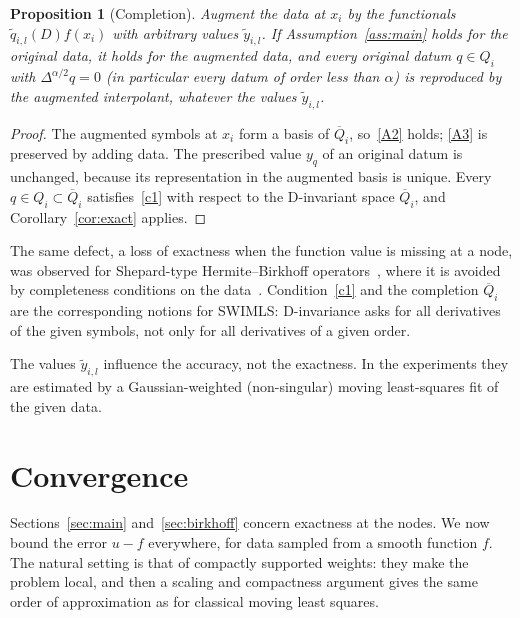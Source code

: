 \documentclass[12pt]{amsart}
\newtheorem{proposition}[theorem]{Proposition}
\theoremstyle{definition}
\theoremstyle{remark}
\begin{document}
\begin{proposition}[Completion]\label{prop:completion}
Augment the data at $x_i$ by the functionals $\tilde q_{i,l}(D)f(x_i)$ with arbitrary values
$\tilde y_{i,l}$. If Assumption~\ref{ass:main} holds for the original data, it holds for the
augmented data, and every original datum $q\in Q_i$ with $\Delta^{\alpha/2}q=0$ (in particular
every datum of order less than $\alpha$) is reproduced by the augmented interpolant, whatever
the values $\tilde y_{i,l}$.
\end{proposition}

\begin{proof}
The augmented symbols at $x_i$ form a basis of $\overline{Q}_i$, so~\ref{A2} holds;
\ref{A3} is preserved by adding data. The prescribed value $y_q$ of an original datum is
unchanged, because its representation in the augmented basis is unique. Every
$q\in Q_i\subset\overline{Q}_i$ satisfies~\ref{c1} with respect to the D-invariant space
$\overline{Q}_i$, and Corollary~\ref{cor:exact} applies.
\end{proof}

The same defect, a loss of exactness when the function value is missing at a node, was
observed for Shepard-type Hermite--Birkhoff operators~\cite{DellAccioDiTommasoSurvey}, where it
is avoided by completeness conditions on the data~\cite{DellAccioDiTommaso2016}. Condition~\ref{c1}
and the completion $\overline Q_i$ are the corresponding notions for SWIMLS: D-invariance asks for
all derivatives of the given symbols, not only for all derivatives of a given order.

The values $\tilde y_{i,l}$ influence the accuracy, not the exactness. In the experiments they
are estimated by a Gaussian-weighted (non-singular) moving least-squares fit of the given data.

\section{Convergence}\label{sec:convergence-theory}

Sections~\ref{sec:main} and~\ref{sec:birkhoff} concern exactness at the nodes. We now bound the
error $u-f$ everywhere, for data sampled from a smooth function $f$. The natural setting is
that of compactly supported weights: they make the problem local, and then a scaling and
compactness argument gives the same order of approximation as for classical moving least
squares.
\end{document}
